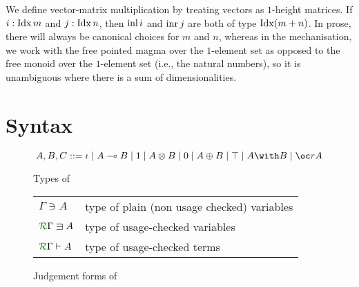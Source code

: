 \documentclass[submission,copyright,creativecommons]{eptcs}
\begin{document}
We define vector-matrix multiplication by treating vectors
as $1$-height matrices.
If $i : \operatorname{Idx} m$ and $j : \operatorname{Idx} n$, then $\operatorname{inl} i$ and $\operatorname{inr} j$ are both of type
$\operatorname{Idx}(m + n)$.
In prose, there will always be canonical choices for $m$ and $n$, whereas in the
mechanisation, we work with the free pointed magma over the $1$-element set as
opposed to the free monoid over the $1$-element set (i.e., the natural numbers),
so it is unambiguous where there is a sum of dimensionalities.

\section{Syntax}\label{sec:syntax}

\begin{figure}
  \begin{displaymath}
    A,B,C ::= \base \mid \fun A B \mid \tensorOne \mid \tensor A B
    \mid \sumTZero \mid \sumT A B \mid \withTOne \mid \withT A B \mid \excl{r} A
  \end{displaymath}
  \caption{Types of \name{}}
  \label{fig:types}
\end{figure}

\begin{figure}
  \centering
  \begin{tabular}{ll}
    $\Gamma \ni A$          & type of plain (non usage checked) variables \\
    $\ctx\Gamma R \lvar A$  & type of usage-checked variables \\
    $\ctx\Gamma R \vdash A$ & type of usage-checked terms
  \end{tabular}
  \caption{Judgement forms of \name{}}
  \label{fig:judgements}
\end{figure}
\end{document}
